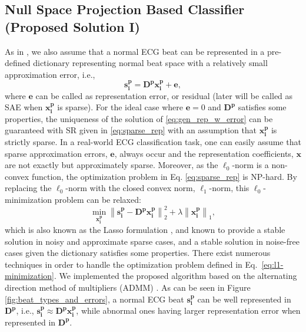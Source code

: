 \documentclass[journal,transmag]{IEEEtran}
\begin{document}
\subsection{Null Space Projection Based Classifier (Proposed Solution I)} \label{sec:NPE}
As in \cite{carrera2016ecg}, we also assume that a normal ECG beat can be represented in a pre-defined dictionary representing normal beat space with a relatively small approximation error, i.e., 
\begin{equation}
\bm{s^p_i}=   \bm{{D^p}} \bm{x^p_i} + \bm{e}, \label{eq:gen_rep_w_error}
\end{equation}
where $\bm{e}$ can be called as representation error, or residual (later will be called as SAE when $\bm{x^p_i}$ is sparse). For the ideal case where $\bm{e} = 0$ and $\bm{{D^p}}$ satisfies some properties, the uniqueness of the solution of \eqref{eq:gen_rep_w_error} can be guaranteed \cite{RIP} with SR given in \eqref{eq:sparse_rep} with an assumption that $\bm{x^p_i}$ is strictly sparse. In a real-world ECG classification task, one can easily assume that sparse approximation errors, $\bm{e}$, always occur and the representation coefficients, $\bm{x}$ are not exactly but approximately sparse. Moreover, as the $\ell_0$-norm is a non-convex function, the optimization problem in Eq. \eqref{eq:sparse_rep} is NP-hard. By replacing the $\ell_0$-norm with the closed convex norm, $\ell_1$-norm, this $\ell_0$-minimization problem can be relaxed:   
\begin{equation}
    \min_{\bm{x^p_i}} \left\| \bm{s^p_i}-  \bm{{D^p}} \bm{x^p_i} \right\|_2^2 + \lambda \left\| \bm{x^p_i} \right\|_1, \label{eq:l1-minimization}
\end{equation}
which is also known as the Lasso formulation \cite{lasso}, and known to provide a stable solution in noisy and approximate sparse cases, and a stable solution in noise-free cases \cite{lasso-stable} given the dictionary satisfies some properties. There exist numerous techniques in order to handle the optimization problem defined in Eq.~\eqref{eq:l1-minimization}. We implemented the proposed algorithm based on the alternating direction method of multipliers (ADMM) \cite{ADMM}. As can be seen in Figure \ref{fig:beat_types_and_errors}, a normal ECG beat $\bm{s^p_i}$ can be well represented in $\bm{{D^p}} $, i.e., $\bm{s^p_i} \approx \bm{{D^p}} \bm{x^p_i}$, while abnormal ones having larger representation error when represented in $\bm{{D^p}} $. 
\end{document}
